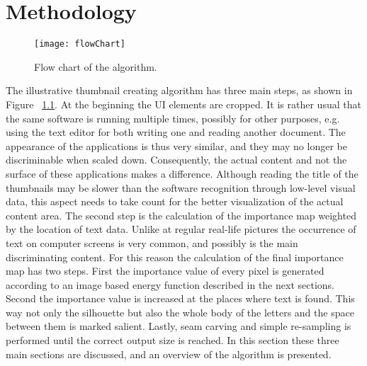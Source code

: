\documentclass[draft,final]{vutinfth} %
\begin{document}
	\chapter{Methodology}
	\begin{figure}
		\centering		
		\texttt{[image: flowChart]}
		\caption{Flow chart of the algorithm.}
		\label{fig:flowChart}
	\end{figure}
	The illustrative thumbnail creating algorithm has three main steps, as shown in Figure ~\ref{fig:flowChart}.
	At the beginning the UI elements are cropped.
	It is rather usual that the same software is running multiple times, possibly for other purposes, e.g. using the text editor for both writing one and reading another document.
	The appearance of the applications is thus very similar, and they may no longer be discriminable when scaled down.  
	Consequently, the actual content and not the surface of these applications makes a difference.
	Although reading the title of the thumbnails may be slower than the software recognition through low-level visual data, this aspect needs to take count for the better visualization of the actual content area.%
	The second step is the calculation of the importance map weighted by the location of text data.
	Unlike at regular real-life pictures the occurrence of text on computer screens is very common, and possibly is the main discriminating content.
	For this reason the calculation of the final importance map has two steps.
	First the importance value of every pixel is generated according to an image based energy function described in the next sections.
	Second the importance value is increased at the places where text is found.
	This way not only the silhouette but also the whole body of the letters and the space between them is marked salient. 
	Lastly, seam carving and simple re-sampling is performed  until the correct output size is reached.
	In this section these three main sections are discussed, and an overview of the algorithm is presented.	
	
\end{document}
